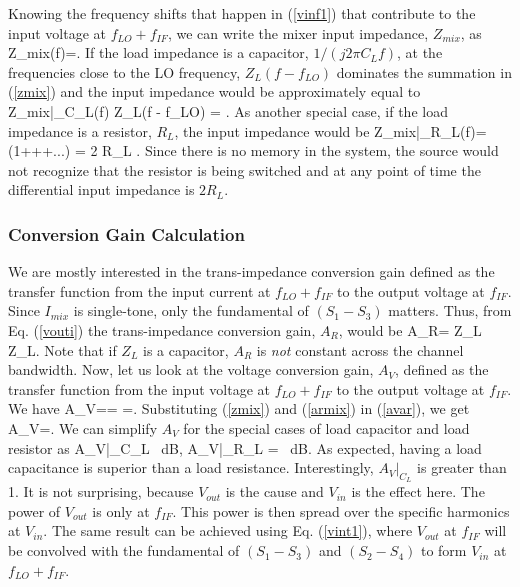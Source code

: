 Knowing the frequency shifts that happen in (\ref{vinf1}) that contribute to the input voltage at $f_{LO}+f_{IF}$, we can write the mixer input
impedance, $Z_{mix}$, as
\beq
Z_{mix}(f)=.
\label{zmix}
\eeq
If the load impedance is a capacitor, $1/(j 2 \pi C_L f)$, at the frequencies close to the LO frequency, $Z_L(f - f_{LO})$ dominates the summation in
(\ref{zmix}) and the input impedance would be approximately equal to
\beq
Z_{mix}|_{C_L}(f) \approx {} Z_L(f - f_{LO}) =  .
\label{zmixc}
\eeq
As another special case, if the load impedance is a resistor, $R_L$, the input impedance would be
\beq
Z_{mix}|_{R_L}(f)=\left(1+++...\right) = 2 R_L .
\label{zmixr}
\eeq
Since there is no memory in the system, the source would not recognize that the resistor is being switched and at any point of time the differential
input impedance is $2 R_L$.



\subsubsection{Conversion Gain Calculation} 
We are mostly interested in the trans-impedance conversion gain defined as the transfer function from the input current at $f_{LO}+f_{IF}$ to the
output voltage at $f_{IF}$. Since $I_{mix}$ is single-tone, only the fundamental of $(S_1-S_3)$ matters. Thus, from Eq. (\ref{vouti}) the
trans-impedance conversion gain, $A_R$, would be
\beq
A_R= Z_L ~  Z_L.
\label{armix}
\eeq
Note that if $Z_L$ is a capacitor, $A_R$ is {\em not} constant across the channel bandwidth. 
Now, let us look at the voltage conversion gain, $A_V$, defined as the transfer function from the input voltage at $f_{LO}+f_{IF}$ to the output
voltage at $f_{IF}$. We have
\beq
A_V== \times {}=.
\label{avar}
\eeq
Substituting (\ref{zmix}) and (\ref{armix}) in (\ref{avar}), we get
\beq
A_V=.
\label{avmix}
\eeq
We can simplify $A_V$ for the special cases of load capacitor and load resistor as
\beq
A_V|_{C_L} \approx {}  ~{dB}, 
\label{avmixc}
\eeq
\beq
A_V|_{R_L} =   ~{dB}.
\label{avmixr}
\eeq
As expected, having a load capacitance is superior than a load resistance. Interestingly, $A_V|_{C_L}$ is greater than 1. It is not surprising,
because $V_{out}$ is the cause and $V_{in}$ is the effect here. The power of $V_{out}$ is only at $f_{IF}$. This power is then spread over the
specific harmonics at $V_{in}$. The same result can be achieved using Eq. (\ref{vint1}), where $V_{out}$ at $f_{IF}$ will be convolved with the
fundamental of $(S_1-S_3)$ and $(S_2-S_4)$ to form $V_{in}$ at $f_{LO}+f_{IF}$.


